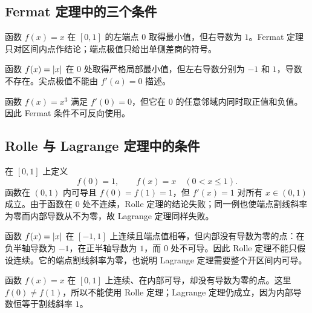 \subsection{Fermat 定理中的三个条件}

\begin{counterexample}[缺少内点条件]
函数 \(f(x)=x\) 在 \([0,1]\) 的左端点 \(0\) 取得最小值，但右导数为 \(1\)。Fermat 定理只对区间内点作结论；端点极值只给出单侧差商的符号。
\end{counterexample}

\begin{counterexample}[缺少可导性]
函数 \(f(x)=\left|x\right|\) 在 \(0\) 处取得严格局部最小值，但左右导数分别为 \(-1\) 和 \(1\)，导数不存在。尖点极值不能由 \(f'(a)=0\) 描述。
\end{counterexample}

\begin{counterexample}[驻点不一定是极值点]
函数 \(f(x)=x^3\) 满足 \(f'(0)=0\)，但它在 \(0\) 的任意邻域内同时取正值和负值。因此 Fermat 条件不可反向使用。
\end{counterexample}

\subsection{Rolle 与 Lagrange 定理中的条件}

\begin{counterexample}[闭区间连续性不可删除]
在 \([0,1]\) 上定义
\[
 f(0)=1,\qquad f(x)=x\quad(0<x\le1).
\]
函数在 \((0,1)\) 内可导且 \(f(0)=f(1)=1\)，但 \(f'(x)=1\) 对所有 \(x\in(0,1)\) 成立。由于函数在 \(0\) 处不连续，Rolle 定理的结论失败；同一例也使端点割线斜率为零而内部导数从不为零，故 Lagrange 定理同样失败。
\end{counterexample}

\begin{counterexample}[内部可导性不可删除]
函数 \(f(x)=\left|x\right|\) 在 \([-1,1]\) 上连续且端点值相等，但内部没有导数为零的点：在负半轴导数为 \(-1\)，在正半轴导数为 \(1\)，而 \(0\) 处不可导。因此 Rolle 定理不能只假设连续。它的端点割线斜率为零，也说明 Lagrange 定理需要整个开区间内可导。
\end{counterexample}

\begin{counterexample}
函数 \(f(x)=x\) 在 \([0,1]\) 上连续、在内部可导，却没有导数为零的点。这里 \(f(0)\ne f(1)\)，所以不能使用 Rolle 定理；Lagrange 定理仍成立，因为内部导数恒等于割线斜率 \(1\)。
\end{counterexample}

